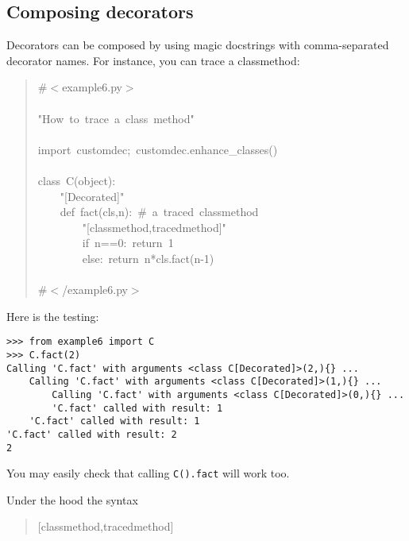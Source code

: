 \documentclass[11pt,english]{article}
\begin{document}
\hypertarget{composing-decorators}{}
\subsection*{Composing decorators}

Decorators can be composed by using magic docstrings with comma-separated
decorator names. For instance, you can trace a classmethod:
\begin{quote}
\begin{ttfamily}\begin{flushleft}
\mbox{{\#}{$<$}example6.py{$>$}}\\
\mbox{}\\
\mbox{"How~to~trace~a~class~method"}\\
\mbox{}\\
\mbox{import~customdec;~customdec.enhance{\_}classes()}\\
\mbox{}\\
\mbox{class~C(object):}\\
\mbox{~~~~"[Decorated]"}\\
\mbox{~~~~def~fact(cls,n):~{\#}~a~traced~classmethod}\\
\mbox{~~~~~~~~"[classmethod,tracedmethod]"}\\
\mbox{~~~~~~~~if~n==0:~return~1}\\
\mbox{~~~~~~~~else:~return~n*cls.fact(n-1)}\\
\mbox{}\\
\mbox{{\#}{$<$}/example6.py{$>$}}
\end{flushleft}\end{ttfamily}
\end{quote}

Here is the testing:
\begin{verbatim}>>> from example6 import C
>>> C.fact(2)
Calling 'C.fact' with arguments <class C[Decorated]>(2,){} ...
    Calling 'C.fact' with arguments <class C[Decorated]>(1,){} ...
        Calling 'C.fact' with arguments <class C[Decorated]>(0,){} ...
        'C.fact' called with result: 1
    'C.fact' called with result: 1
'C.fact' called with result: 2
2\end{verbatim}

You may easily check that calling \texttt{C().fact} will work too.

Under the hood the syntax
\begin{quote}
\begin{ttfamily}\begin{flushleft}
\mbox{[classmethod,tracedmethod]}
\end{flushleft}\end{ttfamily}
\end{quote}
\end{document}
